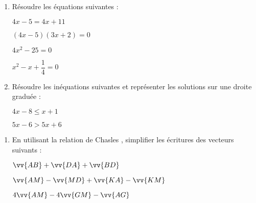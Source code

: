 \documentclass[a4paper,12pt]{article}
\begin{document}
\devoir[prv=true,ds=true,num=4 ,niv=3,sem=2 ,date=02/03/2023]

\begin{exo}[6]
\begin{enumerate}
\item Résoudre les équations suivantes :
\begin{multicols}{4}
$4x-5=4x+11$ \newline
\anserline[4]
\columnbreak

$(4x-5)(3x+2)=0$\newline
\anserline[4]
\columnbreak

$4x^{2}-25=0$\newline
\anserline[4]
\columnbreak

$x^{2}-x+\dfrac{1}{4}=0$\newline
\anserline[4]
\end{multicols}
\item Résoudre les inéquations suivantes et représenter les solutions sur une droite graduée :
\begin{multicols}{2}
$4x-8\leq x+1$ \newline
\anserline[4]
\columnbreak

$5x-6 > 5x+6$\newline
\anserline[4]
\end{multicols}
\end{enumerate}
\end{exo}

\begin{exo}[6]
\begin{enumerate}
\item En utilisant la relation de Chasles , simplifier les écritures des vecteurs suivants :
\begin{multicols}{3}
\(
\vv{AB}+\vv{DA}+\vv{BD}\)\newline
\anserline[4]
\columnbreak

\( \vv{AM}-\vv{MD}+\vv{KA}-\vv{KM}\)\newline
\anserline[4]
\columnbreak

\( 4\vv{AM}-4\vv{GM}-\vv{AG}\)\newline
\anserline[4]
\end{multicols}

\end{enumerate}
\end{exo}
\end{document}
